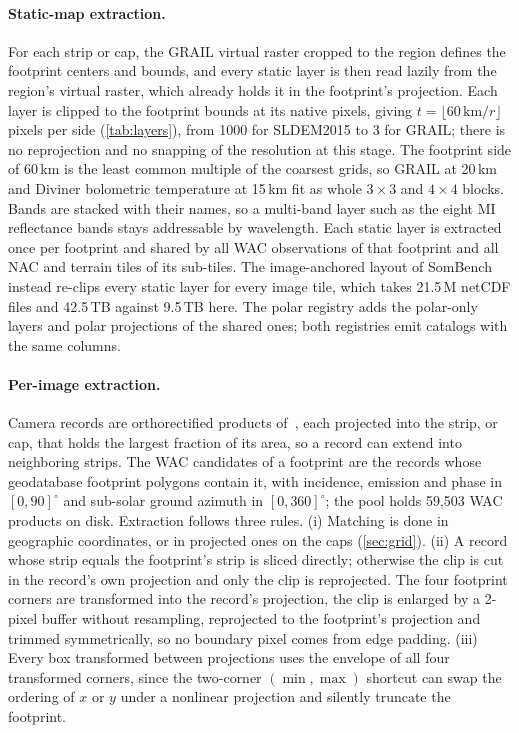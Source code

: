 \paragraph{Static-map extraction.} For each strip or cap, the GRAIL virtual raster cropped to the region defines the footprint centers and bounds, and every static layer is then read lazily from the region's virtual raster, which already holds it in the footprint's projection. Each layer is clipped to the footprint bounds at its native pixels, giving $t = \lfloor 60\,\text{km}/r \rfloor$ pixels per side (\cref{tab:layers}), from 1000 for SLDEM2015 to 3 for GRAIL; there is no reprojection and no snapping of the resolution at this stage. The footprint side of 60\,km is the least common multiple of the coarsest grids, so GRAIL at 20\,km and Diviner bolometric temperature at 15\,km fit as whole $3\times3$ and $4\times4$ blocks.  Bands are stacked with their names, so a multi-band layer such as the eight MI reflectance bands stays addressable by wavelength. Each static layer is extracted once per footprint and shared by all WAC observations of that footprint and all NAC and terrain tiles of its sub-tiles. The image-anchored layout of SomBench instead re-clips every static layer for every image tile, which takes 21.5\,M netCDF files and 42.5\,TB against 9.5\,TB here. The polar registry adds the polar-only layers and polar projections of the shared ones; both registries emit catalogs with the same columns.

\paragraph{Per-image extraction.} Camera records are orthorectified products of~\cite{patil2026sombench}, each projected into the strip, or cap, that holds the largest fraction of its area, so a record can extend into neighboring strips. The WAC candidates of a footprint are the records whose geodatabase footprint polygons contain it, with incidence, emission and phase in $[0, 90]^\circ$ and sub-solar ground azimuth in $[0, 360]^\circ$; the pool holds 59,503 WAC products on disk. Extraction follows three rules. (i) Matching is done in geographic coordinates, or in projected ones on the caps (\cref{sec:grid}). (ii) A record whose strip equals the footprint's strip is sliced directly; otherwise the clip is cut in the record's own projection and only the clip is reprojected. The four footprint corners are transformed into the record's projection, the clip is enlarged by a 2-pixel buffer without resampling, reprojected to the footprint's projection and trimmed symmetrically, so no boundary pixel comes from edge padding. (iii) Every box transformed between projections uses the envelope of all four transformed corners, since the two-corner $(\min, \max)$ shortcut can swap the ordering of $x$ or $y$ under a nonlinear projection and silently truncate the footprint.

